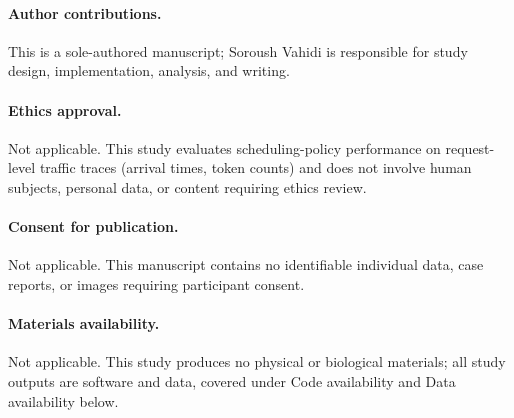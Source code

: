 \documentclass[sn-basic,Numbered,pdflatex]{sn-jnl}
\begin{document}
\paragraph{Author contributions.} This is a sole-authored manuscript;
Soroush Vahidi is responsible for study design, implementation, analysis,
and writing.

\paragraph{Ethics approval.} Not applicable. This study evaluates
scheduling-policy performance on request-level traffic traces (arrival
times, token counts) and does not involve human subjects, personal data,
or content requiring ethics review.

\paragraph{Consent for publication.} Not applicable. This manuscript
contains no identifiable individual data, case reports, or images
requiring participant consent.

\paragraph{Materials availability.} Not applicable. This study produces
no physical or biological materials; all study outputs are software and
data, covered under Code availability and Data availability below.
\end{document}
